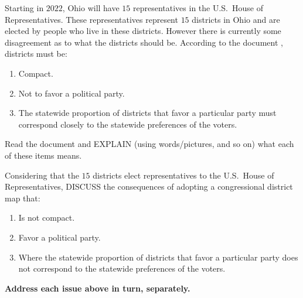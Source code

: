 \documentclass[noauthor,nooutcomes,hints,handout]{ximera}
\begin{document}
\begin{question}
  Starting in $2022$, Ohio will have $15$ representatives in the
  U.S.\ House of Representatives. These representatives represent $15$
  districts in Ohio and are elected by people who live in these
  districts. However there is currently some disagreement as to what
  the districts should be. According to the document , districts must be:
  \begin{enumerate}
  \item Compact.
  \item Not to favor a political party.
  \item The statewide proportion of districts that favor a particular
    party must correspond closely to the statewide preferences of the
    voters.
  \end{enumerate}
  Read the document  and EXPLAIN (using words/pictures, and so on) what each of these items means. 
\end{question}


\mynewpage

\begin{question}
  Considering that the $15$ districts elect representatives to the
  U.S.\ House of Representatives, DISCUSS the consequences of adopting
  a congressional district map that:
  \begin{enumerate}
  \item Is not compact.
  \item Favor a political party.
  \item Where the statewide proportion of districts that favor a
    particular party does not correspond to the statewide preferences
    of the voters.
  \end{enumerate}
  \textbf{Address each issue above in turn, separately.} 
\end{question}
\end{document}
